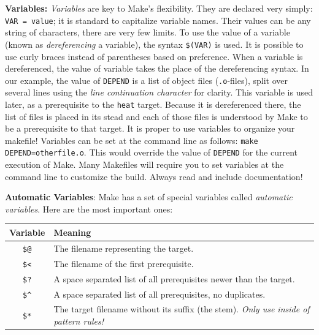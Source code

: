 \documentclass[12pt, letterpaper]{article}
\begin{document}
\noindent \textbf{Variables:} \emph{Variables} are key to Make's flexibility.
They are declared very simply: {\tt VAR = value}; it is standard to 
capitalize variable names.  Their values can be any string of characters, there
are very few limits.  To use the value of a variable (known as 
\emph{dereferencing} a variable), the syntax {\tt \verb|$|(VAR)} is used.  
It is possible to use curly braces instead of parentheses based on preference.
When a variable is dereferenced, the value of variable takes the place of the
dereferencing syntax.  In our example, the value of {\tt DEPEND} is
a list of object files ({\tt *.o}-files), split over several lines using the
\emph{line continuation character} for clarity.  This variable is used
later, as a prerequisite to the {\tt heat} target.  Because it is dereferenced
there, the list of files is placed in its stead and each of those files is
understood by Make to be a prerequisite to that target.  It is proper to
use variables to organize your makefile!
Variables can be set at the command line as follows: 
{\tt make DEPEND=otherfile.o}.  This would override the value of {\tt DEPEND}
for the current execution of Make.  Many Makefiles will require you to set
variables at the command line to customize the build.  Always read and include
documentation!

\vspace{0.5cm}

\noindent \textbf{Automatic Variables}: Make has a set of special variables
called \emph{automatic variables}.  Here are the most important ones:
\begin{center}
  \begin{tabular}{|c|l|}
    \hline
    Variable & Meaning \\
    \hline
    \verb|$@| & The filename representing the target.\\ 
    \verb|$<| & The filename of the first prerequisite.\\
    \verb|$?| & A space separated list of all prerequisites 
    newer than the target.\\
    \verb|$^| & A space separated list of all prerequisites, no duplicates.\\
    \verb|$*| & The target filename without its suffix (the stem).
    \emph{Only use inside of pattern rules!}\\
    \hline
  \end{tabular}
\end{center}

\vspace{0.5cm}
\end{document}
